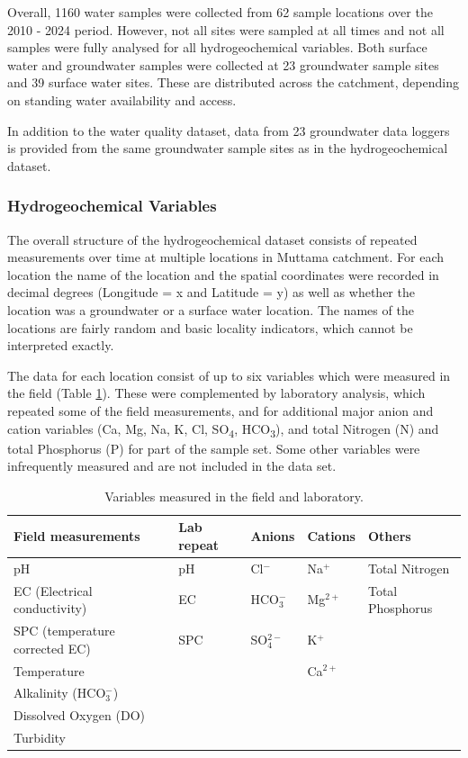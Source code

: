 \documentclass[, manuscript]{copernicus}
\begin{document}
Overall, 1160 water samples were collected from 62 sample locations over
the 2010 - 2024 period. However, not all sites were sampled at all times
and not all samples were fully analysed for all hydrogeochemical
variables. Both surface water and groundwater samples were collected at
23 groundwater sample sites and 39 surface water sites. These are
distributed across the catchment, depending on standing water
availability and access.

In addition to the water quality dataset, data from 23 groundwater data
loggers is provided from the same groundwater sample sites as in the
hydrogeochemical dataset.

\subsubsection{Hydrogeochemical Variables}

The overall structure of the hydrogeochemical dataset consists of
repeated measurements over time at multiple locations in Muttama
catchment. For each location the name of the location and the spatial
coordinates were recorded in decimal degrees (Longitude = x and Latitude
= y) as well as whether the location was a groundwater or a surface
water location. The names of the locations are fairly random and basic
locality indicators, which cannot be interpreted exactly.

The data for each location consist of up to six variables which were
measured in the field (Table \ref{tab:TableMeasurements}). These were
complemented by laboratory analysis, which repeated some of the field
measurements, and for additional major anion and cation variables (Ca,
Mg, Na, K, Cl, SO\textsubscript{4}, HCO\textsubscript{3}), and total
Nitrogen (N) and total Phosphorus (P) for part of the sample set. Some
other variables were infrequently measured and are not included in the
data set.

\begin{table}
\centering
\caption{\label{tab:TableMeasurements}Variables measured in the field and laboratory.}
\centering
\begin{tabular}[t]{l|l|l|l|l}
\hline
Field measurements & Lab repeat & Anions & Cations & Others\\
\hline
pH & pH & Cl$^-$ & Na$^+$ & Total Nitrogen\\
\hline
EC (Electrical conductivity) & EC & HCO$_3^-$ & Mg$^{2+}$ & Total Phosphorus\\
\hline
SPC (temperature corrected EC) & SPC & SO$_4^{2-}$ & K$^+$ & \\
\hline
Temperature &  &  & Ca$^{2+}$ & \\
\hline
Alkalinity (HCO$_3^-$) &  &  &  & \\
\hline
Dissolved Oxygen (DO) &  &  &  & \\
\hline
Turbidity &  &  &  & \\
\hline
\end{tabular}
\end{table}
\end{document}
